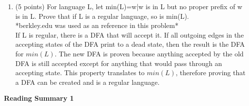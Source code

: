 \documentclass[11pt]{article}
\begin{document}
\begin{enumerate}
  \item (5 points) For language L, let min(L)={w|w is in L but no proper prefix of w is in L}. Prove that if L is a 
  regular language, so is min(L). \\ *berkley.edu was used as an reference in this problem*\\
  If L is regular, there is a DFA that will accept it. If all outgoing edges in the accepting states of the DFA 
  print to a dead state, then the result is the DFA for $min(L)$. The new DFA is proven because anything accepted
  by the old DFA is still accepted except for anything that would pass through an accepting state. This property
  translates to $min(L)$, therefore proving that a DFA can be created and is a regular language.
\end{enumerate}

\pagebreak
\setlength{\parindent}{1cm}
\centerline{\bf Reading Summary 1}
\end{document}
